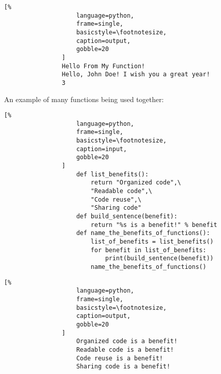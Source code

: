 \documentclass[crop=false,class=article,oneside]{standalone}
\begin{document}
            \begin{minipage}[t]{.48\textwidth}
                \centering
                \begin{lstlisting}[%
                    language=python,
                    frame=single,
                    basicstyle=\footnotesize,
                    caption=output,
                    gobble=20
                ]
                Hello From My Function!
                Hello, John Doe! I wish you a great year!
                3
                \end{lstlisting}
            \end{minipage}
            \newpage
            An example of many functions being used together:
            \newline
            \begin{minipage}[t]{.48\textwidth}
                \centering
                \begin{lstlisting}[%
                    language=python,
                    frame=single,
                    basicstyle=\footnotesize,
                    caption=input,
                    gobble=20
                ]
                    def list_benefits():
                        return "Organized code",\
                        "Readable code",\ 
                        "Code reuse",\
                        "Sharing code"
                    def build_sentence(benefit):
                        return "%s is a benefit!" % benefit
                    def name_the_benefits_of_functions():
                        list_of_benefits = list_benefits()
                        for benefit in list_of_benefits:
                            print(build_sentence(benefit))
                        name_the_benefits_of_functions()
                \end{lstlisting}
            \end{minipage}\hfill
            \begin{minipage}[t]{.48\textwidth}
                \centering
                \begin{lstlisting}[%
                    language=python,
                    frame=single,
                    basicstyle=\footnotesize,
                    caption=output,
                    gobble=20
                ]
                    Organized code is a benefit!
                    Readable code is a benefit!
                    Code reuse is a benefit!
                    Sharing code is a benefit!
                \end{lstlisting}
            \end{minipage}
\end{document}

